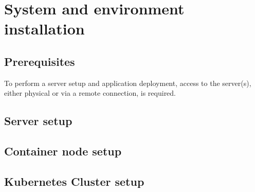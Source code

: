 \chapter{System and environment installation}
\section{Prerequisites}
    To perform a server setup and application deployment, access to the server(s), either physical or via a remote connection, is required.
    
\section{Server setup}
\section{Container node setup}
\section{Kubernetes Cluster setup}

    

    
    
